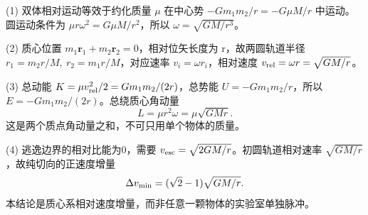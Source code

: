 (1) 双体相对运动等效于约化质量 \(\mu\) 在中心势 \(-Gm_1m_2/r=-G\mu M/r\) 中运动。圆运动条件为 \(\mu r\omega^2=G\mu M/r^2\)，所以 \(\omega=\sqrt{GM/r^3}\)。

(2) 质心位置 \(m_1\boldsymbol r_1+m_2\boldsymbol r_2=0\)，相对位矢长度为 r，故两圆轨道半径 \(r_1=m_2r/M,\ r_2=m_1r/M\)，对应速率 \(v_i=\omega r_i\)，相对速度 \(v_{\rm rel}=\omega r=\sqrt{GM/r}\)。

(3) 总动能 \(K=\mu v_{\rm rel}^2/2=Gm_1m_2/(2r)\)，总势能 \(U=-Gm_1m_2/r\)，所以 \(E=-Gm_1m_2/(2r)\)。总绕质心角动量
\[
L=\mu r^2\omega=\mu\sqrt{GMr}.
\]
这是两个质点角动量之和，不可只用单个物体的质量。

(4) 逃逸边界的相对比能为0，需要 \(v_{\rm esc}=\sqrt{2GM/r}\)。初圆轨道相对速率 \(\sqrt{GM/r}\)，故纯切向的正速度增量
\[
\Delta v_{\rm min}=(\sqrt2-1)\sqrt{GM/r}.
\]
本结论是质心系相对速度增量，而非任意一颗物体的实验室单独脉冲。
